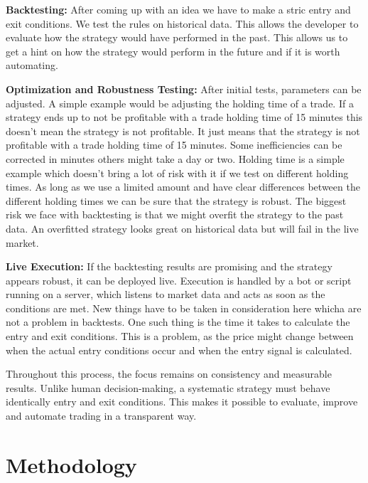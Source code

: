 \documentclass[12pt]{article}
\begin{document}
\textbf{Backtesting:}
After coming up with an idea we have to make a stric entry and exit conditions. We test the rules on historical data. This allows the developer to evaluate how the strategy would have performed in the past. This allows us to get a hint on how the strategy would perform in the future and if it is worth automating. 

\textbf{Optimization and Robustness Testing:}
After initial tests, parameters can be adjusted. A simple example would be adjusting the holding time of a trade. If a strategy ends up to not be profitable with a trade holding time of 15 minutes this doesn't mean the strategy is not profitable. It just means that the strategy is not profitable with a trade holding time of 15 minutes. Some inefficiencies can be corrected in minutes others might take a day or two. Holding time is a simple example which doesn't bring a lot of risk with it if we test on different holding times. As long as we use a limited amount and have clear differences between the different holding times we can be sure that the strategy is robust. The biggest risk we face with backtesting is that we might overfit the strategy to the past data. An overfitted strategy looks great on historical data but will fail in the live market.

\textbf{Live Execution:}
If the backtesting results are promising and the strategy appears robust, it can be deployed live. Execution is handled by a bot or script running on a server, which listens to market data and acts as soon as the conditions are met. New things have to be taken in consideration here whicha are not a problem in backtests. One such thing is the time it takes to calculate the entry and exit conditions. This is a problem, as the price might change between when the actual entry conditions occur and when the entry signal is calculated.

Throughout this process, the focus remains on consistency and measurable results. Unlike human decision-making, a systematic strategy must behave identically entry and exit conditions. This makes it possible to evaluate, improve and automate trading in a transparent way.











\newpage
\section{Methodology}
\end{document}
